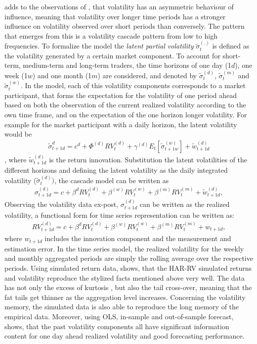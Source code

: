 \textcite{corsi2009} adds to the observations of \textcite{mueller1993}, that volatility has an asymmetric behaviour of influence, meaning that volatility over longer time periods has a stronger influence on volatility observed over short periods than conversely. The pattern that emerges from this is a volatility cascade pattern from low to high frequencies. To formalize the model the \emph{latent partial volatility} $\tilde{\sigma}_{t}^{(.)}$ is defined as the volatility generated by a certain market component. To account for short-term, medium-term and long-term traders, the time horizons of one day (1$d$), one week (1$w$) and one month (1$m$) are considered, and denoted by $\tilde{\sigma}_{t}^{(d)}$, $\tilde{\sigma}_{t}^{(m)}$ and $\tilde{\sigma}_{t}^{(w)}$. In the model, each of this volatility components corresponds to a market participant, that forms the expectation for the volatility of one period ahead based on both the observation of the current realized volatility according to the own time frame, and on the expectation of the one horizon longer volatility. For example for the market participant with a daily horizon, the latent volatility would be
\begin{align*}
\tilde{\sigma}_{t+1d}^{d} = c^{d} + \Phi^{(d)} RV_{t}^{(d)} + \gamma^{(d)} E_{t}[\tilde{\sigma}_{t+1w}^{(w)}] + \tilde{w}_{t+1d}^{(d)}
\end{align*}, 
where $\tilde{w}_{t+1d}^{(d)}$ is the return innovation. Substitution the latent volatilities of the different horizons and defining the latent volatility as the daily integrated volatility ($\tilde{\sigma}_{t}^{(d)})$, the cascade model can be written as
\begin{align}\label{eq:cascade-model}
\sigma_{t+1d}^{(d)} = c + \beta^{d} RV_{t}^{(d)} + \beta^{(w)} RV_{t}^{(w)} + \beta^{(m)} RV_{t}^{(m)} + \tilde{w}_{t+1d}^{(d)},
\end{align}
Observing the volatility data ex-post, $\sigma_{t+1d}^{(d)}$ can be written as the realized volatility, a functional form for time series representation can be written as:
\begin{align}\label{eq:time-series-model}
RV_{t+1d}^{(d)} = c + \beta^{d} RV_{t}^{(d)} + \beta^{(w)} RV_{t}^{(w)} + \beta^{(m)} RV_{t}^{(m)} + w_{t+1d} ,
\end{align}
where $w_{t+1d}$ includes the innovation component and the measurement and estimation error. In the time series model, the realized volatility for the weekly and monthly aggregated periods are simply the rolling average over the respective periods.
Using simulated return data, \textcite{corsi2009} shows, that the HAR-RV simulated returns and volatility reproduce the stylized facts mentioned above very well. The data has not only the excess of kurtosis , but also the tail cross-over, meaning that the fat tails get thinner as the aggregation level increases. Concerning the volatility memory, the simulated data is also able to reproduce the long memory of the empirical data. Moreover, using OLS, in-sample and out-of-sample forecast, \textcite{corsi2009} shows, that the past volatility components all have significant information content for one day ahead realized volatility and good forecasting performance.

